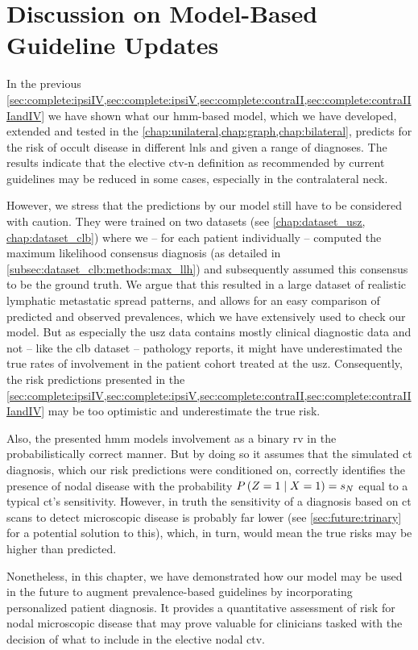 \documentclass[\relativeRoot/main.tex]{subfiles}
\begin{document}
\section[Discussion on Model-Based Guideline Updates]{Discussion on Model-Based\\Guideline Updates}
\label{sec:complete:dicussion}

In the previous \cref{sec:complete:ipsiIV,sec:complete:ipsiV,sec:complete:contraII,sec:complete:contraIIIandIV} we have shown what our \gls{hmm}-based model, which we have developed, extended and tested in the \cref{chap:unilateral,chap:graph,chap:bilateral}, predicts for the risk of occult disease in different \glspl{lnl} and given a range of diagnoses. The results indicate that the elective \gls{ctv-n} definition as recommended by current guidelines \cite{gregoire_delineation_2014,biau_selection_2019} may be reduced in some cases, especially in the contralateral neck.

However, we stress that the predictions by our model still have to be considered with caution. They were trained on two datasets (see \cref{chap:dataset_usz, chap:dataset_clb}) where we -- for each patient individually -- computed the maximum likelihood consensus diagnosis (as detailed in \cref{subsec:dataset_clb:methods:max_llh}) and subsequently assumed this consensus to be the ground truth. We argue that this resulted in a large dataset of realistic lymphatic metastatic spread patterns, and allows for an easy comparison of predicted and observed prevalences, which we have extensively used to check our model. But as especially the \gls{usz} data \cite{ludwig_detailed_2021} contains mostly clinical diagnostic data and not -- like the \gls{clb} dataset \cite{bauwens_prevalence_2021} -- pathology reports, it might have underestimated the true rates of involvement in the patient cohort treated at the \gls{usz}. Consequently, the risk predictions presented in the \cref{sec:complete:ipsiIV,sec:complete:ipsiV,sec:complete:contraII,sec:complete:contraIIIandIV} may be too optimistic and underestimate the true risk.

Also, the presented \gls{hmm} models involvement as a binary \gls{rv} in the probabilistically correct manner. But by doing so it assumes that the simulated \gls{ct} diagnosis, which our risk predictions were conditioned on, correctly identifies the presence of nodal disease with the probability $P \left( Z=1 \mid X=1 \right) = s_N$ equal to a typical \gls{ct}'s sensitivity. However, in truth the sensitivity of a diagnosis based on \gls{ct} scans to detect microscopic disease is probably far lower (see \cref{sec:future:trinary} for a potential solution to this), which, in turn, would mean the true risks may be higher than predicted.

Nonetheless, in this chapter, we have demonstrated how our model may be used in the future to augment prevalence-based guidelines by incorporating personalized patient diagnosis. It provides a quantitative assessment of risk for nodal microscopic disease that may prove valuable for clinicians tasked with the decision of what to include in the elective nodal \gls{ctv}.
\end{document}
